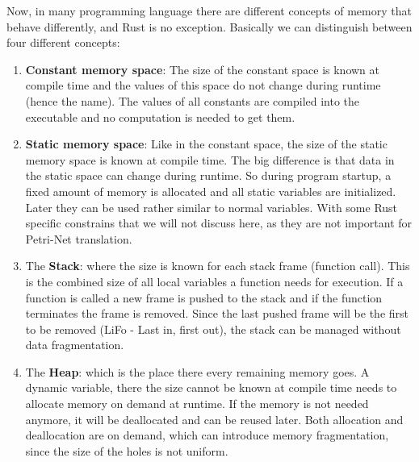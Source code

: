Now, in many programming language there are different concepts of memory that behave differently, and Rust is no exception.
Basically we can distinguish between four different concepts\cite[Chapter 3.1, Chapter 4.1, Chapter 19.1]{klabnik2018rust}:
\begin{enumerate}
    \item \textbf{Constant memory space}: The size of the constant space is known at compile time and the values of this space do not change during runtime (hence the name).
    The values of all constants are compiled into the executable and no computation is needed to get them.
    \item \textbf{Static memory space}: Like in the constant space, the size of the static memory space is known at compile time.
    The big difference is that data in the static space can change during runtime.
    So during program startup, a fixed amount of memory is allocated and all static variables are initialized.
    Later they can be used rather similar to normal variables. With some Rust specific constrains that we will not discuss here, as they are not important for Petri-Net translation.
    \item The \textbf{Stack}: where the size is known for each stack frame (function call).
    This is the combined size of all local variables a function needs for execution.
    If a function is called a new frame is pushed to the stack and if the function terminates the frame is removed.
    Since the last pushed frame will be the first to be removed (LiFo - Last in, first out), the stack can be managed without data fragmentation.
    \item The \textbf{Heap}: which is the place there every remaining memory goes.
    A dynamic variable, there the size cannot be known at compile time needs to allocate memory on demand at runtime.
    If the memory is not needed anymore, it will be deallocated and can be reused later.
    Both allocation and deallocation are on demand, which can introduce memory fragmentation, since the size of the holes is not uniform.
\end{enumerate}

